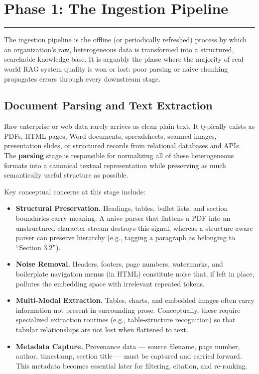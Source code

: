 \documentclass[11pt,a4paper]{article}
\newcommand{\sectionrule}{\vspace{-0.2cm}\noindent\textcolor{ragblue!40}{\rule{\linewidth}{0.6pt}}\vspace{0.3cm}}
\begin{document}
\newpage

\section{Phase 1: The Ingestion Pipeline}
\sectionrule

The ingestion pipeline is the offline (or periodically refreshed) process by which an organization's raw, heterogeneous data is transformed into a structured, searchable knowledge base. It is arguably the phase where the majority of real-world RAG system quality is won or lost: poor parsing or naive chunking propagates errors through every downstream stage.

\subsection{Document Parsing and Text Extraction}

Raw enterprise or web data rarely arrives as clean plain text. It typically exists as PDFs, HTML pages, Word documents, spreadsheets, scanned images, presentation slides, or structured records from relational databases and APIs. The \textbf{parsing} stage is responsible for normalizing all of these heterogeneous formats into a canonical textual representation while preserving as much semantically useful structure as possible.

Key conceptual concerns at this stage include:

\begin{itemize}
  \item \textbf{Structural Preservation.} Headings, tables, bullet lists, and section boundaries carry meaning. A naive parser that flattens a PDF into an unstructured character stream destroys this signal, whereas a structure-aware parser can preserve hierarchy (e.g., tagging a paragraph as belonging to ``Section 3.2'').
  \item \textbf{Noise Removal.} Headers, footers, page numbers, watermarks, and boilerplate navigation menus (in HTML) constitute noise that, if left in place, pollutes the embedding space with irrelevant repeated tokens.
  \item \textbf{Multi-Modal Extraction.} Tables, charts, and embedded images often carry information not present in surrounding prose. Conceptually, these require specialized extraction routines (e.g., table-structure recognition) so that tabular relationships are not lost when flattened to text.
  \item \textbf{Metadata Capture.} Provenance data --- source filename, page number, author, timestamp, section title --- must be captured and carried forward. This metadata becomes essential later for filtering, citation, and re-ranking.
\end{itemize}
\end{document}
